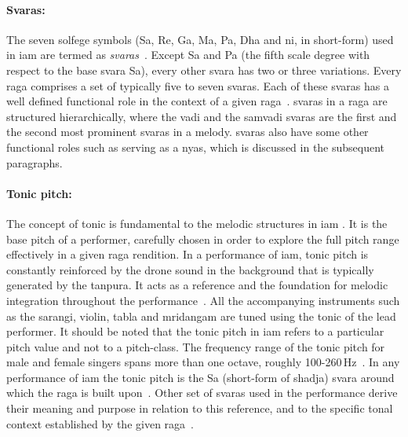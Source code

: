 \paragraph{Svaras:} The seven solfege symbols (Sa, Re, Ga, Ma, Pa, Dha and \acrshort{ni}, in short-form) used in \gls{iam} are termed as \textit{svaras}~\citep{Danielou2010,Bagchee1998}. Except Sa and Pa (the fifth scale degree with respect to the base \gls{svara} Sa), every other \gls{svara} has two or three variations. Every \gls{raga} comprises a set of typically five to seven \glspl{svara}. Each of these \glspl{svara} has a well defined functional role in the context of a given \gls{raga}~\citep{Viswanathan2004}. \Glspl{svara} in a \gls{raga} are structured hierarchically, where the \gls{vadi} and the \gls{samvadi} \glspl{svara} are the first and the second most prominent \glspl{svara} in a melody. \Glspl{svara} also have some other functional roles such as serving as a \gls{nyas}, which is discussed in the subsequent paragraphs. 

\paragraph{Tonic pitch:} The concept of tonic is fundamental to the melodic structures in \gls{iam} \citep{Viswanathan2004,Danielou2010}. It is the base pitch of a performer, carefully chosen in order to explore the full pitch range effectively in a given \gls{raga} rendition. In a performance of \gls{iam}, tonic pitch is constantly reinforced by the drone sound in the background that is typically generated by the \gls{tanpura}. It acts as a reference and the foundation for melodic integration throughout the performance~\citep{Deva1980}. All the accompanying instruments such as the \gls{sarangi}, violin, \gls{tabla} and \gls{mridangam} are tuned using the tonic of the lead performer. It should be noted that the tonic pitch in \gls{iam} refers to a particular pitch value and not to a pitch-class. The frequency range of the tonic pitch for male and female singers spans more than one octave, roughly 100-260\,Hz~\citep{Sengupta2005b}. In any performance of \gls{iam} the tonic pitch is the Sa (short-form of \gls{shadja}) \gls{svara} around which the \gls{raga} is built upon~\citep{Danielou2010,Bagchee1998}. Other set of \glspl{svara} used in the performance derive their meaning and purpose in relation to this reference, and to the specific tonal context established by the given \gls{raga}~\citep{Deva1980}. 

